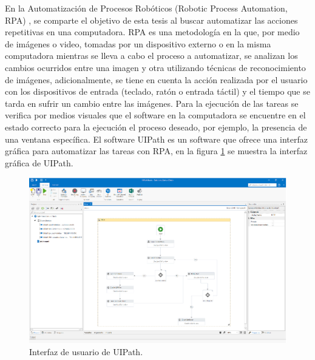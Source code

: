En la Automatizaci\'on de Procesos Rob\'oticos (Robotic Process Automation, RPA)
 \cite{Bataller2017}, se comparte el objetivo de esta tesis al buscar 
 automatizar las acciones repetitivas en una computadora. RPA es una 
 metodolog\'ia en la que, por medio de im\'agenes o video, tomadas por un 
 dispositivo externo o en la misma computadora mientras se lleva a cabo el 
 proceso a automatizar, se analizan los cambios ocurridos entre una imagen y 
 otra utilizando t\'ecnicas de reconocimiento de im\'agenes, adicionalmente, se 
 tiene en cuenta la acci\'on realizada por el usuario con los dispositivos de 
 entrada (teclado, rat\'on o entrada t\'actil) y el tiempo que se tarda en 
 sufrir un cambio entre las im\'agenes. Para la ejecuci\'on de las tareas se 
 verifica por medios visuales que el software en la computadora se encuentre 
 en el estado correcto para la ejecuci\'on el proceso deseado, por ejemplo, la 
 presencia de una ventana espec\'ifica. El software UIPath \cite{Dines2018}
 es un software que ofrece una interfaz gr\'afica para automatizar las tareas
 con RPA, en la figura \ref{fig:uipath} se muestra la interfaz gr\'afica de
 UIPath.
 
\begin{figure}[h]
\centering
\includegraphics[width=0.8\columnwidth]{chap2/Imagenes/rpauipath.eps}
\caption{Interfaz de usuario de UIPath\cite{Dines2018}.}
\label{fig:uipath}
\end{figure}